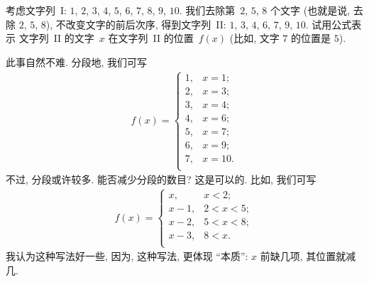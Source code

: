 \begin{example}
    考虑文字列~I:
    \(1\), \(2\), \(3\), \(4\), \(5\),
    \(6\), \(7\), \(8\), \(9\), \(10\).
    我们去除第~\(2\), \(5\), \(8\) 个文字
    (也就是说, 去除 \(2\), \(5\), \(8\)),
    不改变文字的前后次序,
    得到文字列~II:
    \(1\), \(3\), \(4\), \(6\), \(7\), \(9\), \(10\).
    试用公式表示%
    文字列~II 的文字~\(x\) 在文字列~II 的位置~\(f(x)\)
    (比如, 文字 \(7\) 的位置是 \(5\)).

    此事自然不难.
    分段地, 我们可写
    \begin{align*}
        f(x) =
        \begin{cases}
            1, & x = 1;  \\
            2, & x = 3;  \\
            3, & x = 4;  \\
            4, & x = 6;  \\
            5, & x = 7;  \\
            6, & x = 9;  \\
            7, & x = 10. \\
        \end{cases}
    \end{align*}
    不过, 分段或许较多.
    能否减少分段的数目?
    这是可以的.
    比如,
    我们可写
    \begin{align*}
        f(x) =
        \begin{cases}
            x,     & x < 2;     \\
            x - 1, & 2 < x < 5; \\
            x - 2, & 5 < x < 8; \\
            x - 3, & 8 < x.     \\
        \end{cases}
    \end{align*}
    我认为这种写法好一些,
    因为, 这种写法, 更体现 ``本质'':
    \(x\) 前缺几项, 其位置就减几.


\end{example}
